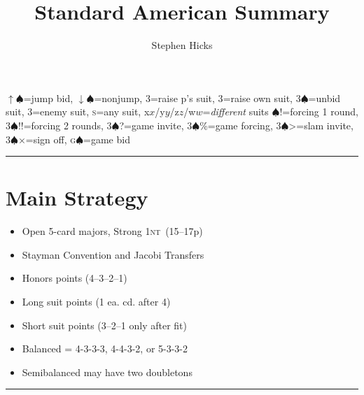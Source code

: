 \documentclass[landscape]{article}
\makeatletter
\def\udots{\bgroup \markoverwith{\lower2.5\p@\hbox{\kern-0.7\p@
  .\kern0\p@}}\ULon}
\newcommand{\optionalmath}[1]{\ifmmode#1\else$#1$\fi}
\def\S{\optionalmath\spadesuit}
\def\NT{\ifmmode\mathsc{nt}\else\textsc{nt}\fi}
\def\s{\textsc{s}}
\def\game{\textsc{g}}
\def\x{\optionalmath x}
\def\y{\optionalmath y}
\def\z{\optionalmath z}
\def\w{\optionalmath w}
\def\force{!}
\def\inv{?}
\def\si{>}
\def\so{\optionalmath\times}
\def\gf{\%}
\def\nojump{\optionalmath\downarrow}
\def\jump{\optionalmath\uparrow}
\newcommand{\crunch}[1][.6]{\vspace*{-#1pc}}
\def\unbid#1{\uline{#1}}
\def\raise#1{\uwave{#1}}
\def\rebid#1{\udots{#1}}
\def\cue#1{\begingroup\setbox0=\hbox{#1}\dimen0=\wd0\dimen1=\ht0\dimen2=\dp0%
\setbox1=\hbox{\fbox{\setbox2=\hbox{}%
\advance\dimen0 by -4pt \advance\dimen1 by -1pt \advance\dimen2 by -1pt%
\wd2=\dimen0\ht2=\dimen1\dp2=\dimen2\box2}}%
\wd1=0pt\ht1=0pt\dp1=0pt\box1\hskip1pt\box0\hskip3pt\endgroup}
\def\cue#1{\uuline{#1}}
\newenvironment{column}[1][0.33]{\begin{minipage}[t]{#1\columnwidth}}{\end{minipage}}
\newenvironment{mylist}[1][.5]{\begin{itemize}\itemsep=-#1\baselineskip}{\end{itemize}}
\makeatother
\begin{document}
\title{Standard American Summary}
\author{Stephen Hicks}
{\center\noindent 
\jump3\S=jump bid, \nojump3\S=nonjump,
3\raise{\S}=raise p's suit, 3\rebid{\S}=raise own suit,
3\unbid{\S}=unbid suit, 3\cue{\S}=enemy suit, 
\s=any suit, \x/\y/\z/\w=\emph{different\/} suits}\vspace*{-9pt}
{\S\force=forcing 1 round, 3\S\force\force=forcing 2 rounds,
3\S\inv=game invite, 3\S\gf=game forcing, 
3\S\si=slam invite, 3\S\so=sign off, \game\S=game bid
}\vspace*{4pt}\hrule\vspace*{4pt}
\begin{column}
\section{Main Strategy}
\begin{mylist}[.2]
\item Open 5-card majors, Strong 1\NT\ (15--17p)
\item Stayman Convention and Jacobi Transfers
\item Honors points (4--3--2--1)
\item Long suit points (1 ea. cd. after 4)
\item Short suit points (3--2--1 only after fit)
\item Balanced = 4-3-3-3, 4-4-3-2, or 5-3-3-2
\item Semibalanced may have two doubletons
\end{mylist}
\hrule\crunch

\end{column}
\end{document}
